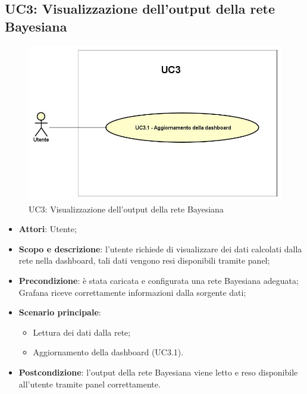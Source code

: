 \subsection{UC3: Visualizzazione dell'output della rete Bayesiana}
\hypertarget{UC3}{}
\begin{figure} [H]
	\centering
	\includegraphics[scale=0.45]{Img/UC3}
	\caption{UC3: Visualizzazione dell'output della rete Bayesiana}\label{}
\end{figure}
\begin{itemize}
	\item \textbf{Attori}: Utente;
	\item \textbf{Scopo e descrizione}: l'utente richiede di visualizzare dei dati calcolati dalla rete nella dashboard, tali dati vengono resi disponibili tramite panel;
	\item \textbf{Precondizione}: è stata caricata e configurata una rete Bayesiana adeguata; Grafana riceve correttamente informazioni dalla sorgente dati;
	\item \textbf{Scenario principale}:
	\begin{itemize}
		\item Lettura dei dati dalla rete;
		\item Aggiornamento della dashboard (UC3.1).
	\end{itemize}
	\item \textbf{Postcondizione}: l'output della rete Bayesiana viene letto e reso disponibile all'utente tramite panel correttamente.
\end{itemize}
